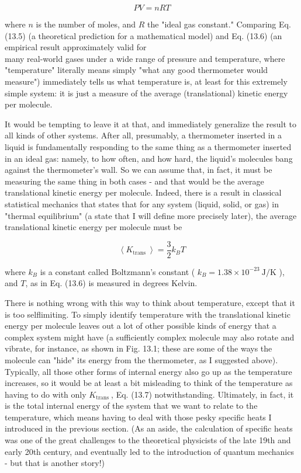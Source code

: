 \documentclass[10pt]{article}
\begin{document}
\begin{equation*}
P V=n R T \tag{13.6}
\end{equation*}


where $n$ is the number of moles, and $R$ the "ideal gas constant." Comparing Eq. (13.5) (a theoretical prediction for a mathematical model) and Eq. (13.6) (an empirical result approximately valid for\\
many real-world gases under a wide range of pressure and temperature, where "temperature" literally means simply "what any good thermometer would measure") immediately tells us what temperature is, at least for this extremely simple system: it is just a measure of the average (translational) kinetic energy per molecule.

It would be tempting to leave it at that, and immediately generalize the result to all kinds of other systems. After all, presumably, a thermometer inserted in a liquid is fundamentally responding to the same thing as a thermometer inserted in an ideal gas: namely, to how often, and how hard, the liquid's molecules bang against the thermometer's wall. So we can assume that, in fact, it must be measuring the same thing in both cases - and that would be the average translational kinetic energy per molecule. Indeed, there is a result in classical statistical mechanics that states that for any system (liquid, solid, or gas) in "thermal equilibrium" (a state that I will define more precisely later), the average translational kinetic energy per molecule must be


\begin{equation*}
\left\langle K_{\text {trans }}\right\rangle=\frac{3}{2} k_{B} T \tag{13.7}
\end{equation*}


where $k_{B}$ is a constant called Boltzmann's constant ( $k_{B}=1.38 \times 10^{-23} \mathrm{~J} / \mathrm{K}$ ), and $T$, as in Eq. (13.6) is measured in degrees Kelvin.

There is nothing wrong with this way to think about temperature, except that it is too selflimiting. To simply identify temperature with the translational kinetic energy per molecule leaves out a lot of other possible kinds of energy that a complex system might have (a sufficiently complex molecule may also rotate and vibrate, for instance, as shown in Fig. 13.1; these are some of the ways the molecule can "hide" its energy from the thermometer, as I suggested above). Typically, all those other forms of internal energy also go up as the temperature increases, so it would be at least a bit misleading to think of the temperature as having to do with only $K_{\text {trans }}$, Eq. (13.7) notwithstanding. Ultimately, in fact, it is the total internal energy of the system that we want to relate to the temperature, which means having to deal with those pesky specific heats I introduced in the previous section. (As an aside, the calculation of specific heats was one of the great challenges to the theoretical physicists of the late 19th and early 20th century, and eventually led to the introduction of quantum mechanics - but that is another story!)
\end{document}
